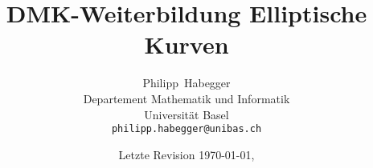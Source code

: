 \documentclass[a4paper,12pt,oneside]{scrbook}
\begin{document}
\title{DMK-Weiterbildung Elliptische Kurven}
\author{Philipp~Habegger \\ Departement Mathematik und Informatik
 \\ Universität Basel \\ \texttt{philipp.habegger@unibas.ch}}
\date{Letzte Revision \today, \currenttime}

\maketitle
\tableofcontents

\setcounter{chapter}{-1}








\vfill\hfill\texttt{}
\end{document}
